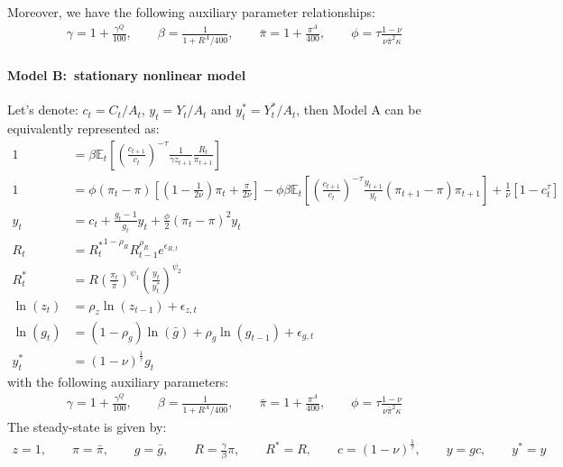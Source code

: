 Moreover, we have the following auxiliary parameter relationships:
\begin{align*}
\gamma = 1+\frac{\gamma^{Q}}{100}, \qquad
\beta = \frac{1}{1+R^{A}/400}, \qquad
\bar{\pi} = 1+\frac{\pi^{A}}{400}, \qquad
\phi=\tau\frac{1-\nu}{\nu\bar{\pi}^2\kappa}
\end{align*}

\paragraph{Model B:\ stationary nonlinear model}
Let's denote: \(c_t= C_t/A_t\), \(y_t= Y_t/A_t\) and \(y^*_t= Y^*_t/A_t\), then Model A can be equivalently represented as:
\begin{align}
1 &= \beta \mathbb{E}_t\left[{\left(\frac{c_{t+1}}{c_t}\right)}^{-\tau} \frac{1}{\gamma z_{t+1}} \frac{R_t}{\pi_{t+1}}\right] \label{eq:AS_B1}
\\
1 &= \phi \left(\pi_t - \pi\right) \left[\left(1-\frac{1}{2\nu}\right)\pi_t + \frac{\pi}{2\nu}\right]
- \phi \beta \mathbb{E}_t \left[{\left(\frac{c_{t+1}}{c_t}\right)}^{-\tau} \frac{y_{t+1}}{y_t} \left(\pi_{t+1} - \pi \right) \pi_{t+1}\right] + \frac{1}{\nu}\left[1-c_t^{\tau}\right]
\\
y_t &= c_t + \frac{g_t-1}{g_t} y_t + \frac{\phi}{2} {\left({\pi_t - \pi}\right)}^2 y_t
\\
R_t &= {R_t^{*}}^{1-\rho_R} R_{t-1}^{\rho_R} e^{\epsilon_{R,t}}
\\
R_t^* & = R {\left(\frac{\pi_t}{\bar{\pi}}\right)}^{\psi_1} {\left(\frac{y_t}{y_t^*}\right)}^{\psi_2}
\\
\ln(z_t) &= \rho_z \ln(z_{t-1}) + \epsilon_{z,t}
\\
\ln(g_t) &= (1-\rho_g)\ln(\bar{g}) + \rho_g \ln(g_{t-1}) + \epsilon_{g,t}
\\
y_t^* &= {(1-\nu)}^{\frac{1}{\tau}} g_t
\end{align}
with the following auxiliary parameters:
\begin{align*}
  \gamma = 1+\frac{\gamma^{Q}}{100}, \qquad
  \beta = \frac{1}{1+R^{A}/400}, \qquad
  \bar{\pi} = 1+\frac{\pi^{A}}{400}, \qquad
  \phi=\tau\frac{1-\nu}{\nu\bar{\pi}^2\kappa}
\end{align*}
The steady-state is given by:
\begin{align*}
z=1, \qquad\pi = \bar{\pi}, \qquad g=\bar{g}, \qquad R=\frac{\gamma}{\beta}\pi, \qquad R^* = R, \qquad c = {(1-\nu)}^{\frac{1}{\tau}}, \qquad y = gc , \qquad y^*=y
\end{align*}


